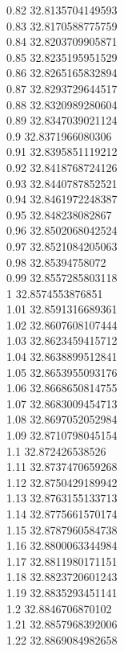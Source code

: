 {0.82	32.8135704149593\\
0.83	32.8170588775759\\
0.84	32.8203709905871\\
0.85	32.8235195951529\\
0.86	32.8265165832894\\
0.87	32.8293729644517\\
0.88	32.8320989280604\\
0.89	32.8347039021124\\
0.9	32.8371966080306\\
0.91	32.8395851119212\\
0.92	32.8418768724126\\
0.93	32.8440787852521\\
0.94	32.8461972248387\\
0.95	32.848238082867\\
0.96	32.8502068042524\\
0.97	32.8521084205063\\
0.98	32.85394758072\\
0.99	32.8557285803118\\
1	32.8574553876851\\
1.01	32.8591316689361\\
1.02	32.8607608107444\\
1.03	32.8623459415712\\
1.04	32.8638899512841\\
1.05	32.8653955093176\\
1.06	32.8668650814755\\
1.07	32.8683009454713\\
1.08	32.8697052052984\\
1.09	32.8710798045154\\
1.1	32.872426538526\\
1.11	32.8737470659268\\
1.12	32.8750429189942\\
1.13	32.8763155133713\\
1.14	32.8775661570174\\
1.15	32.8787960584738\\
1.16	32.8800063344984\\
1.17	32.8811980171151\\
1.18	32.8823720601243\\
1.19	32.8835293451141\\
1.2	32.8846706870102\\
1.21	32.8857968392006\\
1.22	32.8869084982658\\
}
